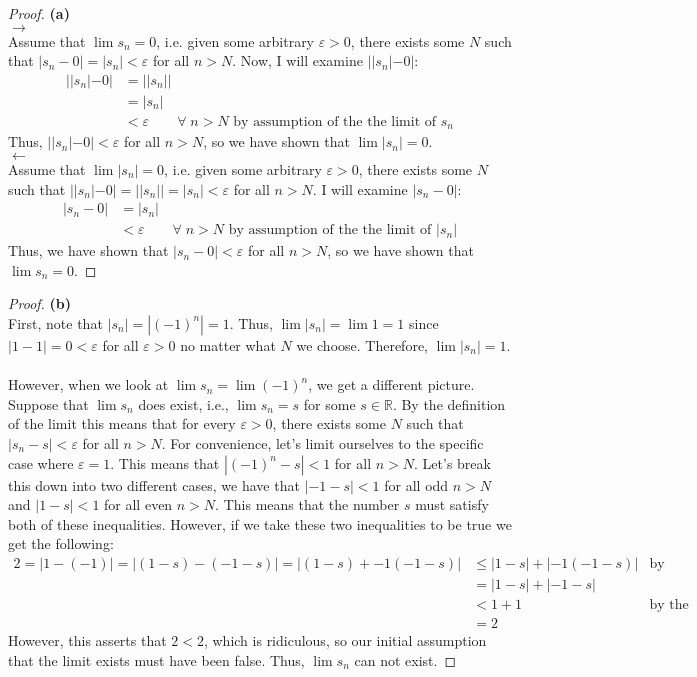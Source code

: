 \documentclass[10pt,a4paper]{article}
\theoremstyle{definition}
\begin{document}
\begin{proof}{\textbf{(a)}}
\\$\rightarrow$
\\Assume that $\lim s_n = 0$, i.e. given some arbitrary $\varepsilon > 0$, there exists some $N$ such that $|s_n - 0| = |s_n| < \varepsilon$ for all $n > N$. Now, I will examine $||s_n| - 0|$:
\begin{align*}
||s_n| - 0| &= ||s_n||\\
&= |s_n|\\
&< \varepsilon \quad \quad \forall \; n > N \text{ by assumption of the the limit of } s_n
\end{align*}
Thus, $||s_n| - 0| < \varepsilon$ for all $n > N$, so we have shown that $\lim |s_n| = 0$.
\\$\leftarrow$
\\Assume that $\lim |s_n| = 0$, i.e. given some arbitrary $\varepsilon > 0$, there exists some $N$ such that $||s_n| - 0| = ||s_n|| = |s_n| < \varepsilon$ for all $n > N$. I will examine $|s_n - 0|$:
\begin{align*}
|s_n - 0| &= |s_n|\\
&< \varepsilon \quad \quad \forall \; n > N \text{ by assumption of the the limit of } |s_n|
\end{align*}
Thus, we have shown that $|s_n - 0| < \varepsilon$ for all $n> N$, so we have shown that $\lim s_n = 0$.
\end{proof}

\begin{proof}{\textbf{(b)}}
\\First, note that $|s_n| = |(-1)^n| = 1$. Thus, $\lim |s_n| = \lim 1 = 1$ since $|1 - 1| = 0 < \varepsilon$ for all $\varepsilon > 0$ no matter what $N$ we choose. Therefore, $\lim |s_n| = 1$.
\\
\\However, when we look at $\lim s_n = \lim (-1)^n$, we get a different picture. Suppose that $\lim s_n$ does exist, i.e., $\lim s_n = s$ for some $s \in \mathbb{R}$. By the definition of the limit this means that for every $\varepsilon > 0$, there exists some $N$ such that $|s_n - s| < \varepsilon$ for all $n > N$. For convenience, let's limit ourselves to the specific case where $\varepsilon = 1$. This means that $|(-1)^n - s| < 1$ for all $n > N$. Let's break this down into two different cases, we have that $|-1 - s| < 1$ for all odd $n > N$ and $|1 - s| < 1$ for all even $n > N$. This means that the number $s$ must satisfy both of these inequalities. However, if we take these two inequalities to be true we get the following:
\begin{align*}
2 = |1 - (-1)| = |(1 - s) - (-1 - s)| = |(1 - s) + -1(-1 - s)| &\leq |1 - s| + |-1(-1 - s)| &\text{by Triangle Inequality}\\
&= |1 - s| + |-1 - s|\\
&< 1 + 1 &\text{by the above inequalities}\\
&= 2
\end{align*}
However, this asserts that $2 < 2$, which is ridiculous, so our initial assumption that the limit exists must have been false. Thus, $\lim s_n$ can not exist. 
\end{proof}
\end{document}
